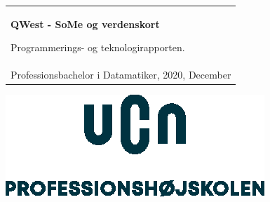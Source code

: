 %
\begin{titlepage}
\pagecolor{ucngrey}\afterpage{\nopagecolor}

\vspace*{\fill}

  \addtolength{\hoffset}{0.5\evensidemargin-0.5\oddsidemargin} %
  \noindent%
  {\color{white}\colorbox{ucnblue}{\begin{tabular}{@{}p{\textwidth}@{}}
    \begin{center}
    \Huge{\textbf{
      QWest - SoMe og verdenskort%
    }}
    \end{center}
    \begin{center}
      \Large{
        Programmerings- og teknologirapporten.
      }
    \end{center}
    \vspace{0.2cm}
   \begin{center}
    {\Large
      Benyad Jomhur, Lucca Christiansen, Alexandra Østermark, Søren Ravn%
    }\\
    \vspace{0.2cm}
    {\large
    Professionsbachelor i Datamatiker, 2020, December%
    }
   \end{center}
   \vspace{0.2cm}
   \begin{center}
    {\Large
      3. Semester prøven i Programming og Teknologi 
    }
   \end{center}
  \end{tabular}}}
  \vfill
  \begin{center}
    \includegraphics[width=0.2\paperwidth]{figures/formalities/UCN-hovedlogo}
  \end{center}
\end{titlepage}
\clearpage